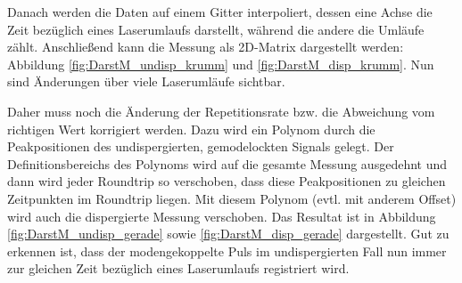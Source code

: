 \documentclass[bachelor,       %
               twoside,        %
               BCOR10mm,       %
               liststotoc,nomtotoc,bibtotoc, %
               english,ngerman, %
               final,          %
               ]{GAUBM}
\begin{document}
Danach werden die Daten auf einem Gitter interpoliert, dessen eine Achse die Zeit bezüglich eines Laserumlaufs darstellt, während die andere die Umläufe zählt.
Anschließend kann die Messung als 2D-Matrix dargestellt werden: Abbildung \ref{fig:DarstM_undisp_krumm} und \ref{fig:DarstM_disp_krumm}.
Nun sind Änderungen über viele Laserumläufe sichtbar.


Daher muss noch die Änderung der Repetitionsrate bzw. die Abweichung vom richtigen Wert korrigiert werden.
Dazu wird ein Polynom durch die Peakpositionen des undispergierten, gemodelockten Signals gelegt. Der Definitionsbereichs des Polynoms wird auf die gesamte Messung ausgedehnt und dann wird jeder Roundtrip so verschoben, dass diese Peakpositionen zu gleichen Zeitpunkten im Roundtrip liegen.
Mit diesem Polynom (evtl. mit anderem Offset) wird auch die dispergierte Messung verschoben.
Das Resultat ist in Abbildung \ref{fig:DarstM_undisp_gerade} sowie \ref{fig:DarstM_disp_gerade} dargestellt.
Gut zu erkennen ist, dass der modengekoppelte Puls im undispergierten Fall nun immer zur gleichen Zeit bezüglich eines Laserumlaufs registriert wird.
\end{document}
